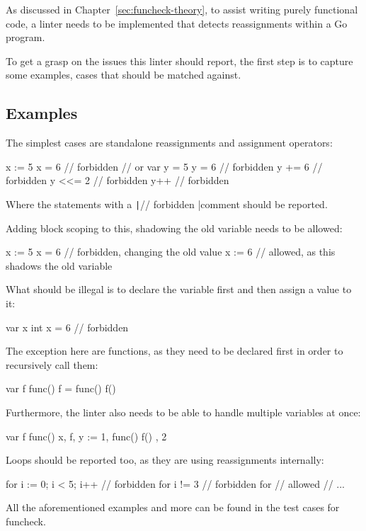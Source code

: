 As discussed in Chapter~\ref{sec:funcheck-theory}, to assist writing purely
functional code, a linter needs to be implemented that detects reassignments within
a Go program.

To get a grasp on the issues this linter should report, the first step
is to capture some examples, cases that should be matched against.

\subsection{Examples}

The simplest cases are standalone reassignments and assignment operators:
\begin{gocode}
x := 5
x = 6 // forbidden
// or
var y = 5
y = 6   // forbidden
y += 6  // forbidden
y <<= 2 // forbidden
y++     // forbidden
\end{gocode}

Where the statements with a \texttt|// forbidden
|comment should be reported.

Adding block scoping to this, shadowing the old variable needs to be allowed:
\begin{gocode}
x := 5
{
	x = 6  // forbidden, changing the old value
	x := 6 // allowed, as this shadows the old variable
}
\end{gocode}

What should be illegal is to declare the variable first and then assign a
value to it:
\begin{gocode}
var x int
x = 6 // forbidden
\end{gocode}

The exception here are functions, as they need to be declared first in order
to recursively call them:
\begin{gocode}
var f func()
f = func() {
	f()
}
\end{gocode}

Furthermore, the linter also needs to be able to handle multiple variables
at once:
\begin{gocode}
var f func()
x, f, y := 1, func() { f() }, 2
\end{gocode}

Loops should be reported too, as they are using reassignments internally:
\begin{gocode}
for i := 0; i < 5; i++ { // forbidden
	for i != 3 { // forbidden
		for { // allowed
			// ...
		}
	}
}
\end{gocode}

All the aforementioned examples and more can be found in the test cases for funcheck\autocite{funcheck-examples}.

